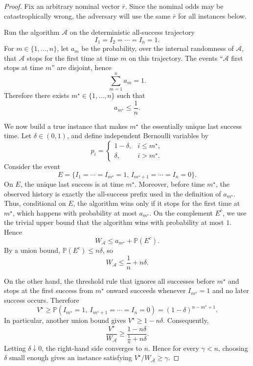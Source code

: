 \documentclass[11pt,a4paper]{article}
\begin{document}
\begin{proof}
Fix an arbitrary nominal vector \(\bar r\).  Since the nominal odds may be
catastrophically wrong, the adversary will use the same \(\bar r\) for all instances
below.

Run the algorithm \(\mathcal A\) on the deterministic all-success trajectory
\[
  I_1=I_2=\cdots=I_n=1.
\]
For \(m\in\{1,\ldots,n\}\), let \(a_m\) be the probability, over the internal
randomness of \(\mathcal A\), that \(\mathcal A\) stops for the first time at
time \(m\) on this trajectory.  The events ``\(\mathcal A\) first stops at time
\(m\)'' are disjoint, hence
\[
  \sum_{m=1}^n a_m = 1.
\]
Therefore there exists \(m^\star\in\{1,\ldots,n\}\) such that
\[
  a_{m^\star}\le\frac1n.
\]

We now build a true instance that makes \(m^\star\) the essentially unique last
success time.  Let \(\delta\in(0,1)\), and define independent Bernoulli
variables by
\[
  p_i=
  \begin{cases}
    1-\delta, & i\le m^\star,\\
    \delta, & i>m^\star.
  \end{cases}
\]
Consider the event
\[
  E=
  \{I_1=\cdots=I_{m^\star}=1,\,
    I_{m^\star+1}=\cdots=I_n=0\}.
\]
On \(E\), the unique last success is at time \(m^\star\).  Moreover, before time
\(m^\star\), the observed history is exactly the all-success prefix used in the
definition of \(a_{m^\star}\).  Thus, conditional on \(E\), the algorithm wins
only if it stops for the first time at \(m^\star\), which happens with
probability at most \(a_{m^\star}\).  On the complement \(E^c\), we use the
trivial upper bound that the algorithm wins with probability at most \(1\).
Hence
\[
  W_{\mathcal A}
  \le
  a_{m^\star}+\mathbb P(E^c).
\]
By a union bound, \(\mathbb P(E^c)\le n\delta\), so
\[
  W_{\mathcal A}\le\frac1n+n\delta.
\]

On the other hand, the threshold rule that ignores all successes before
\(m^\star\) and stops at the first success from \(m^\star\) onward succeeds
whenever \(I_{m^\star}=1\) and no later success occurs.  Therefore
\[
  V^\star
  \ge
  \mathbb P(I_{m^\star}=1,\ I_{m^\star+1}=\cdots=I_n=0)
  =
  (1-\delta)^{n-m^\star+1}.
\]
In particular, another union bound gives \(V^\star\ge1-n\delta\).  Consequently,
\[
  \frac{V^\star}{W_{\mathcal A}}
  \ge
  \frac{1-n\delta}{\frac1n+n\delta}.
\]
Letting \(\delta\downarrow0\), the right-hand side converges to \(n\).  Hence
for every \(\gamma<n\), choosing \(\delta\) small enough gives an instance
satisfying \(V^\star/W_{\mathcal A}\ge\gamma\).
\end{proof}
\end{document}
